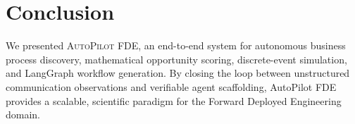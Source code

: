 \documentclass[sigconf,natbib=true]{acmart}
\begin{document}
\section{Conclusion}
\label{sec:conclusion}

We presented \textsc{AutoPilot FDE}, an end-to-end system for autonomous business process discovery, mathematical opportunity scoring, discrete-event simulation, and LangGraph workflow generation. By closing the loop between unstructured communication observations and verifiable agent scaffolding, AutoPilot FDE provides a scalable, scientific paradigm for the Forward Deployed Engineering domain.



\end{document}
